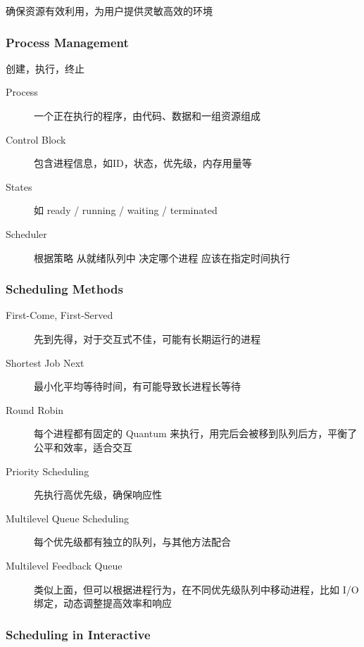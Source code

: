 \documentclass[11pt,journal,compsoc]{IEEEtran}
\begin{document}
确保资源有效利用，为用户提供灵敏高效的环境


\subsubsection{Process Management}

创建，执行，终止

\begin{description}
    \item[Process] 一个正在执行的程序，由代码、数据和一组资源组成

    \item[Control Block] 包含进程信息，如ID，状态，优先级，内存用量等

    \item[States] 如 ready / running / waiting / terminated

    \item[Scheduler] 根据策略 从就绪队列中 决定哪个进程 应该在指定时间执行
\end{description}


\subsubsection{Scheduling Methods}

\begin{description}
    \item[First-Come, First-Served] 先到先得，对于交互式不佳，可能有长期运行的进程

    \item[Shortest Job Next] 最小化平均等待时间，有可能导致长进程长等待

    \item[Round Robin] 每个进程都有固定的 Quantum 来执行，用完后会被移到队列后方，平衡了公平和效率，适合交互

    \item[Priority Scheduling] 先执行高优先级，确保响应性

    \item[Multilevel Queue Scheduling] 每个优先级都有独立的队列，与其他方法配合

    \item[Multilevel Feedback Queue] 类似上面，但可以根据进程行为，在不同优先级队列中移动进程，比如 I/O 绑定，动态调整提高效率和响应
\end{description}


\subsubsection{Scheduling in Interactive}
\end{document}
